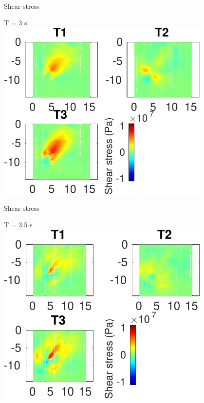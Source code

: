 \documentclass{beamer}
\begin{document}
\begin{frame}
 {Shear stress}
 
 \centering \Large T = 3 s\\
 \includegraphics[width=0.8\textwidth]{images/vertical_00036}
 
\end{frame}

\begin{frame}
 {Shear stress}
 
 \centering \Large T = 3.5 s\\
 \includegraphics[width=0.8\textwidth]{images/vertical_00041}
 
\end{frame}
\end{document}
